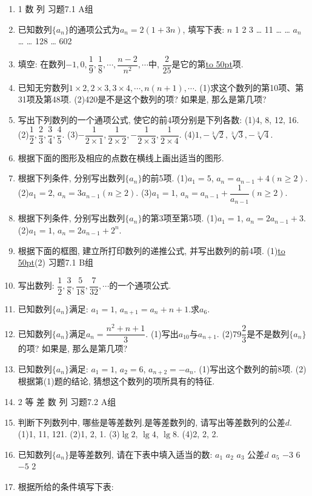 \documentclass[10pt,a4paper]{article}
\newcommand{\blank}[1]{\underline{\hbox to #1pt{}}}
\begin{document}
\begin{enumerate}[1.]


\item 1  数  列
习题7.1  A组
\item 已知数列$\{a_n\}$的通项公式为$a_n=2(1+3n)$, 填写下表:
$n$	1	2	3	…	11	…		…	
$a_n$				…		…	128	…	602
\item 填空:
在数列$-1,0,\dfrac 19,\dfrac 18,\cdots ,\dfrac{n-2}{n^2},\cdots$中, $\dfrac 2{25}$是它的第\blank{50}项.
\item 已知无穷数列$1\times 2,2\times 3,3\times 4,\cdots ,n(n+1),\cdots$.
(1)求这个数列的第10项、第31项及第48项.
(2)420是不是这个数列的项? 如果是, 那么是第几项?
\item 写出下列数列的一个通项公式, 使它的前4项分别是下列各数:
(1)4, 8, 12, 16.
(2)$\dfrac 12,\dfrac 23,\dfrac 34,\dfrac 45$.
(3)$-\dfrac 1{2\times 1},\dfrac 1{2\times 2},-\dfrac 1{2\times 3},\dfrac 1{2\times 4}$.
(4)$1,-\sqrt[3]2,\sqrt[3]3,-\sqrt[3]4$.
\item 根据下面的图形及相应的点数在横线上画出适当的图形.
\item 根据下列条件, 分别写出数列$\{a_n\}$的前5项.
(1)$a_1=5$, $a_n=a_{n-1}+4(n\ge 2)$.
(2)$a_1=2$, $a_n=3a_{n-1}(n\ge 2)$.
(3)$a_1=1$, $a_n=a_{n-1}+\dfrac 1{a_{n-1}}(n\ge 2)$.
\item 根据下列条件, 分别写出数列$\{a_n\}$的第3项至第5项.
(1)$a_1=1$, $a_n=2a_{n-1}+3$.
(2)$a_1=1$, $a_n=2a_{n-1}+2^n$.
\item 根据下面的框图, 建立所打印数列的递推公式, 并写出数列的前4项.
(1)\blank{50}(2)
习题7.1  B组
\item 写出数列: $\dfrac 12,\dfrac 38,\dfrac 5{18},\dfrac 7{32},\cdots$的一个通项公式.
\item 已知数列$\{a_n\}$满足: $a_1=1$, $a_{n+1}=a_n+n+1$.求$a_6$.
\item 已知数列$\{a_n\}$满足$a_n=\dfrac{n^2+n+1}3$.
(1)写出$a_{10}$与$a_{n+1}$.
(2)$79\dfrac 23$是不是数列$\{a_n\}$的项? 如果是, 那么是第几项?
\item 已知数列$\{a_n\}$满足: $a_1=1$, $a_2=6$, $a_{n+2}=-a_n$.
(1)写出这个数列的前8项.
(2)根据第(1)题的结论, 猜想这个数列的项所具有的特征.
\item 2  等 差 数 列
习题7.2  A组
\item 判断下列数列中, 哪些是等差数列.是等差数列的, 请写出等差数列的公差$d$.
(1)1, 11, 121.							(2)1, 2, 1.
(3)$\lg 2$, $\lg 4$, $\lg 8$.					(4)2, 2, 2.
\item 已知数列$\{a_n\}$是等差数列, 请在下表中填入适当的数:
$a_1$	$a_2$	$a_3$	公差$d$	$a_5$
$-3$		6		
    $-5$		2	
\item 根据所给的条件填写下表:

\end{enumerate}
\end{document}
